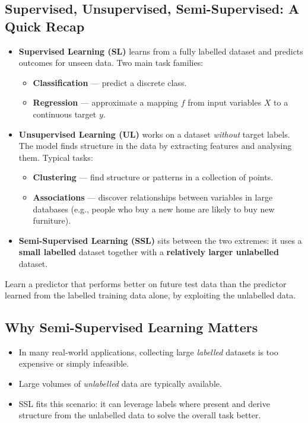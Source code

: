 \documentclass[11pt,a4paper]{article}
\theoremstyle{definition}
\theoremstyle{plain}
\theoremstyle{remark}
\begin{document}
\subsection{Supervised, Unsupervised, Semi-Supervised: A Quick Recap}

\begin{itemize}
    \item \textbf{Supervised Learning (SL)} learns from a fully labelled dataset and predicts outcomes for unseen data. Two main task families:
    \begin{itemize}
        \item \textbf{Classification} --- predict a discrete class.
        \item \textbf{Regression} --- approximate a mapping $f$ from input variables $X$ to a continuous target $y$.
    \end{itemize}
    \item \textbf{Unsupervised Learning (UL)} works on a dataset \emph{without} target labels. The model finds structure in the data by extracting features and analysing them. Typical tasks:
    \begin{itemize}
        \item \textbf{Clustering} --- find structure or patterns in a collection of points.
        \item \textbf{Associations} --- discover relationships between variables in large databases (e.g., people who buy a new home are likely to buy new furniture).
    \end{itemize}
    \item \textbf{Semi-Supervised Learning (SSL)} sits between the two extremes: it uses a \textbf{small labelled} dataset together with a \textbf{relatively larger unlabelled} dataset.
\end{itemize}

\begin{tcolorbox}[colback=green!5!white,colframe=green!60!black,title=\textbf{Goal of Semi-Supervised Learning}]
Learn a predictor that performs better on future test data than the predictor learned from the labelled training data alone, by exploiting the unlabelled data.
\end{tcolorbox}

\subsection{Why Semi-Supervised Learning Matters}

\begin{itemize}
    \item In many real-world applications, collecting large \emph{labelled} datasets is too expensive or simply infeasible.
    \item Large volumes of \emph{unlabelled} data are typically available.
    \item SSL fits this scenario: it can leverage labels where present and derive structure from the unlabelled data to solve the overall task better.
\end{itemize}
\end{document}
